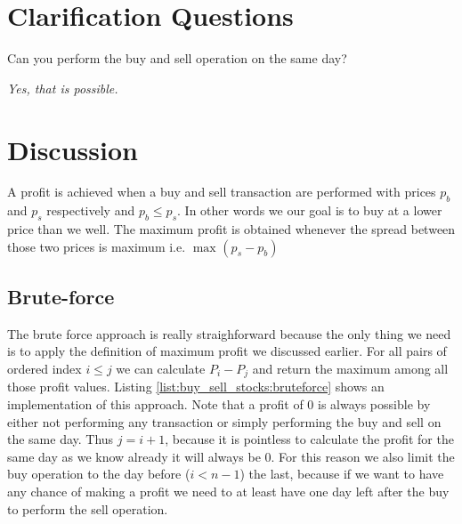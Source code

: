 \section{Clarification Questions}

\begin{QandA}
	\item \begin{questionitem} \begin{question} Can you perform the buy and sell operation on the same day?  \end{question}      
    \begin{answered}
		\textit{Yes, that is possible.}
	\end{answered} \end{questionitem}
\end{QandA}

\section{Discussion}
\label{buy_sell_stocks:sec:discussion}
A profit is achieved when a buy and sell transaction are performed with prices $p_b$ and $p_s$ respectively and $p_b \leq p_s$. In other words we our goal is to buy at a lower price than we well. The maximum profit is obtained whenever the spread between those two prices is maximum i.e. $\max_{}{(p_s - p_b)}$

\subsection{Brute-force}
\label{buy_sell_stocks:sec:bruteforce}
The brute force approach is really straighforward because the only thing we need is to apply the definition of maximum profit we discussed earlier. For all pairs of ordered index $i \leq j$ we can calculate $P_i - P_j$ and return the maximum among all those profit values. Listing \ref{list:buy_sell_stocks:bruteforce} shows an implementation of this approach. Note that a profit of $0$ is always possible by either not performing any transaction or simply performing the buy and sell on the same day. Thus $j = i+1$, because it is pointless to calculate the profit for the same day as we know already it will always be $0$. For this reason we also limit the buy operation to the day before ($i< n-1$) the last, because if we want to have any chance of making a profit we need to at least have one day left after the buy to perform the sell operation. 



